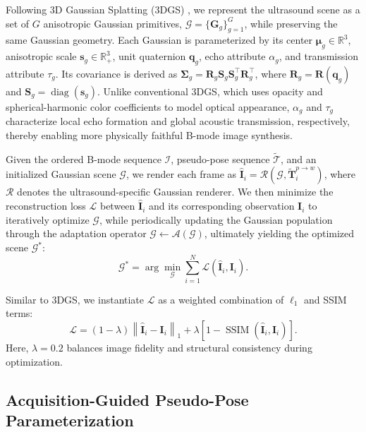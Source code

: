 Following 3D Gaussian Splatting (3DGS)
\cite{kerbl3DGaussianSplatting2023}, we represent the ultrasound scene as a
set of $G$ anisotropic Gaussian primitives,
$\mathcal G=\{\mathbf G_g\}_{g=1}^{G}$, while preserving the same Gaussian
geometry. Each Gaussian is parameterized by its center
$\boldsymbol\mu_g\in\mathbb R^3$, anisotropic scale
$\mathbf s_g\in\mathbb R_+^3$, unit quaternion $\mathbf q_g$, echo attribute
$\alpha_g$, and transmission attribute $\tau_g$. Its covariance is derived as
$\boldsymbol\Sigma_g
=
\mathbf R_g\mathbf S_g\mathbf S_g^\top\mathbf R_g^\top$,
where $\mathbf R_g=\mathbf R(\mathbf q_g)$ and
$\mathbf S_g=\operatorname{diag}(\mathbf s_g)$. Unlike conventional 3DGS,
which uses opacity and spherical-harmonic color coefficients to model optical
appearance, $\alpha_g$ and $\tau_g$ characterize local echo formation and
global acoustic transmission, respectively, 
thereby enabling more physically faithful B-mode image synthesis.

Given the ordered B-mode sequence $\mathcal I$, pseudo-pose sequence
$\widetilde{\mathcal T}$, and an initialized Gaussian scene $\mathcal G$, we
render each frame as
$\widehat{\mathbf I}_i
=
\mathcal R(\mathcal G,\widetilde{\mathbf T}_i^{p\rightarrow w})$,
where $\mathcal R$ denotes the ultrasound-specific Gaussian renderer. We then
minimize the reconstruction loss $\mathcal L$ between
$\widehat{\mathbf I}_i$ and its corresponding observation $\mathbf I_i$ to
iteratively optimize $\mathcal G$, while periodically updating the Gaussian
population through the adaptation operator
$\mathcal G\leftarrow\mathcal A(\mathcal G)$, ultimately yielding the
optimized scene $\mathcal G^{*}$:
\begin{equation}
\mathcal G^{*}
=
\arg\min_{\mathcal G}
\sum_{i=1}^{N}
\mathcal L
\left(
\widehat{\mathbf I}_i,
\mathbf I_i
\right).
\label{eq:overall-reconstruction}
\end{equation}

Similar to 3DGS, we instantiate $\mathcal L$ as a weighted combination of
$\ell_1$ and SSIM terms:
\begin{equation}
\mathcal L
=
(1-\lambda)
\left\|
\widehat{\mathbf I}_i-\mathbf I_i
\right\|_1
+
\lambda
\left[
1-
\operatorname{SSIM}
\left(
\widehat{\mathbf I}_i,
\mathbf I_i
\right)
\right].
\label{eq:total-loss}
\end{equation}
Here, $\lambda=0.2$ balances image fidelity and structural consistency during
optimization.

\vspace{-3mm}
\subsection{Acquisition-Guided Pseudo-Pose Parameterization}
\label{sec:acquisition-guided-pseudo-pose-parameterization}

